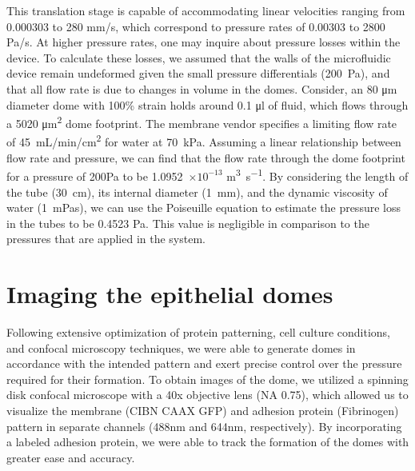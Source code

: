This translation stage is capable of accommodating linear velocities ranging from 0.000303 to 280 \unit{mm/s}, which correspond to pressure rates of 0.00303 to 2800 \unit{Pa/s}. At higher pressure rates, one may inquire about pressure losses within the device. To calculate these losses, we assumed that the walls of the microfluidic device remain undeformed given the small pressure differentials (200~Pa), and that all flow rate is due to changes in volume in the domes. Consider, an 80 \unit{\um} diameter dome with 100\% strain holds around 0.1 \unit{\ul} of fluid, which flows through a 5020 \unit{\micro\meter\squared} dome footprint. The membrane vendor specifies a limiting flow rate of 45~\unit{mL/min/cm^2} for water at 70~kPa. Assuming a linear relationship between flow rate and pressure, we can find that the flow rate through the dome footprint for a pressure of 200Pa to be 1.0952~$\times 10^{-13}$ \unit{\cubic\meter\per\second}. By considering the length of the tube (30~cm), its internal diameter (1~mm), and the dynamic viscosity of water (1~mPas), we can use the Poiseuille equation to estimate the pressure loss in the tubes to be 0.4523 Pa. This value is negligible in comparison to the pressures that are applied in the system.


\hypertarget{imaging-the-epithelial-domes}{%
\section{Imaging the epithelial
domes}\label{imaging-the-epithelial-domes}}

Following extensive optimization of protein patterning, cell culture conditions, and confocal microscopy techniques, we were able to generate domes in accordance with the intended pattern and exert precise control over the pressure required for their formation. To obtain images of the dome, we utilized a spinning disk confocal microscope with a 40x objective lens (NA 0.75), which allowed us to visualize the membrane (CIBN CAAX GFP) and adhesion protein (Fibrinogen) pattern in separate channels (488\unit{\nm} and 644\unit{\nm}, respectively). By incorporating a labeled adhesion protein, we were able to track the formation of the domes with greater ease and accuracy.


